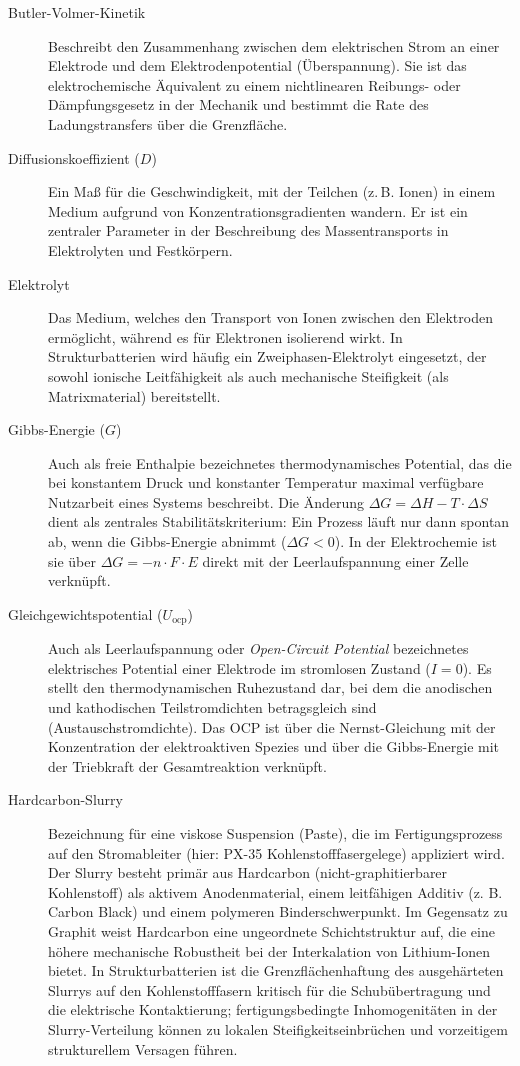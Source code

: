 \begin{description}
    \item[Butler-Volmer-Kinetik] Beschreibt den Zusammenhang zwischen dem elektrischen Strom an einer Elektrode und dem Elektrodenpotential (Überspannung). Sie ist das elektrochemische Äquivalent zu einem nichtlinearen Reibungs- oder Dämpfungsgesetz in der Mechanik und bestimmt die Rate des Ladungstransfers über die Grenzfläche.
    
    \item[Diffusionskoeffizient ($D$)] Ein Maß für die Geschwindigkeit, mit der Teilchen (z.\,B. Ionen) in einem Medium aufgrund von Konzentrationsgradienten wandern. Er ist ein zentraler Parameter in der Beschreibung des Massentransports in Elektrolyten und Festkörpern.

    \item[Elektrolyt] Das Medium, welches den Transport von Ionen zwischen den Elektroden ermöglicht, während es für Elektronen isolierend wirkt. In Strukturbatterien wird häufig ein Zweiphasen-Elektrolyt eingesetzt, der sowohl ionische Leitfähigkeit als auch mechanische Steifigkeit (als Matrixmaterial) bereitstellt.
    
    \item[Gibbs-Energie ($G$)] Auch als freie Enthalpie bezeichnetes thermodynamisches Potential, das die bei konstantem Druck und konstanter Temperatur maximal verfügbare Nutzarbeit eines Systems beschreibt. Die Änderung $\Delta G = \Delta H - T \cdot \Delta S$ dient als zentrales Stabilitätskriterium: Ein Prozess läuft nur dann spontan ab, wenn die Gibbs-Energie abnimmt ($\Delta G < 0$). In der Elektrochemie ist sie über $\Delta G = -n \cdot F \cdot E$ direkt mit der Leerlaufspannung einer Zelle verknüpft.

    \item[Gleichgewichtspotential ($U_{\text{ocp}}$)] Auch als Leerlaufspannung oder \textit{Open-Circuit Potential} bezeichnetes elektrisches Potential einer Elektrode im stromlosen Zustand ($I = 0$). Es stellt den thermodynamischen Ruhezustand dar, bei dem die anodischen und kathodischen Teilstromdichten betragsgleich sind (Austauschstromdichte). Das OCP ist über die Nernst-Gleichung mit der Konzentration der elektroaktiven Spezies und über die Gibbs-Energie mit der Triebkraft der Gesamtreaktion verknüpft.

    \item[Hardcarbon-Slurry] Bezeichnung für eine viskose Suspension (Paste), die im Fertigungsprozess auf den Stromableiter (hier: PX-35 Kohlenstofffasergelege) appliziert wird. Der Slurry besteht primär aus Hardcarbon (nicht-graphitierbarer Kohlenstoff) als aktivem Anodenmaterial, einem leitfähigen Additiv (z. B. Carbon Black) und einem polymeren Binderschwerpunkt. Im Gegensatz zu Graphit weist Hardcarbon eine ungeordnete Schichtstruktur auf, die eine höhere mechanische Robustheit bei der Interkalation von Lithium-Ionen bietet. In Strukturbatterien ist die Grenzflächenhaftung des ausgehärteten Slurrys auf den Kohlenstofffasern kritisch für die Schubübertragung und die elektrische Kontaktierung; fertigungsbedingte Inhomogenitäten in der Slurry-Verteilung können zu lokalen Steifigkeitseinbrüchen und vorzeitigem strukturellem Versagen führen.


\end{description}
